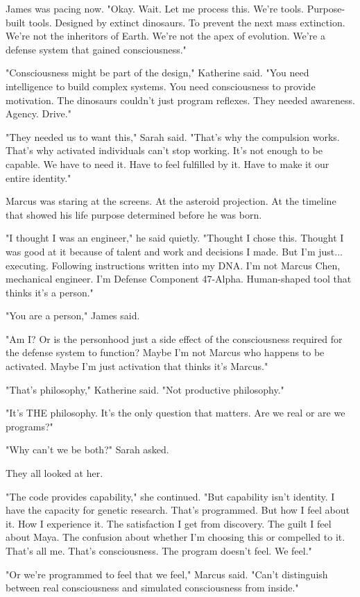 James was pacing now. "Okay. Wait. Let me process this. We're tools. Purpose-built tools. Designed by extinct dinosaurs. To prevent the next mass extinction. We're not the inheritors of Earth. We're not the apex of evolution. We're a defense system that gained consciousness."

"Consciousness might be part of the design," Katherine said. "You need intelligence to build complex systems. You need consciousness to provide motivation. The dinosaurs couldn't just program reflexes. They needed awareness. Agency. Drive."

"They needed us to want this," Sarah said. "That's why the compulsion works. That's why activated individuals can't stop working. It's not enough to be capable. We have to need it. Have to feel fulfilled by it. Have to make it our entire identity."

Marcus was staring at the screens. At the asteroid projection. At the timeline that showed his life purpose determined before he was born.

"I thought I was an engineer," he said quietly. "Thought I chose this. Thought I was good at it because of talent and work and decisions I made. But I'm just... executing. Following instructions written into my DNA. I'm not Marcus Chen, mechanical engineer. I'm Defense Component 47-Alpha. Human-shaped tool that thinks it's a person."

"You are a person," James said.

"Am I? Or is the personhood just a side effect of the consciousness required for the defense system to function? Maybe I'm not Marcus who happens to be activated. Maybe I'm just activation that thinks it's Marcus."

"That's philosophy," Katherine said. "Not productive philosophy."

"It's THE philosophy. It's the only question that matters. Are we real or are we programs?"

"Why can't we be both?" Sarah asked.

They all looked at her.

"The code provides capability," she continued. "But capability isn't identity. I have the capacity for genetic research. That's programmed. But how I feel about it. How I experience it. The satisfaction I get from discovery. The guilt I feel about Maya. The confusion about whether I'm choosing this or compelled to it. That's all me. That's consciousness. The program doesn't feel. We feel."

"Or we're programmed to feel that we feel," Marcus said. "Can't distinguish between real consciousness and simulated consciousness from inside."

